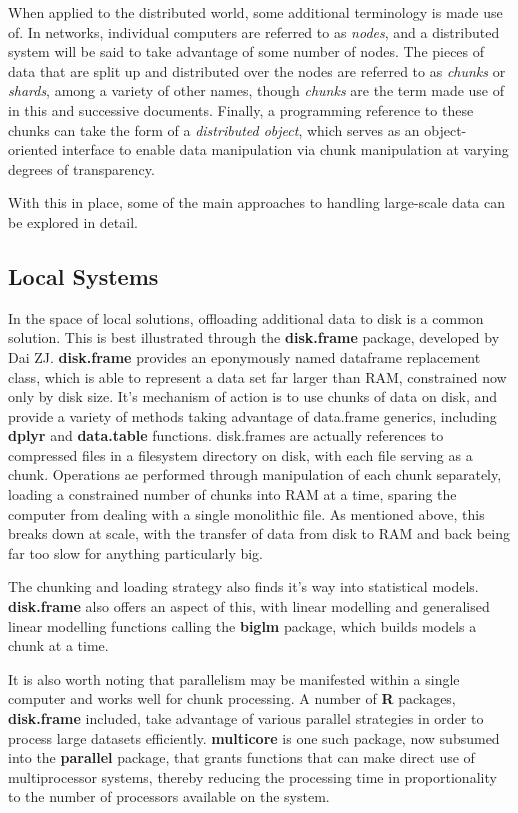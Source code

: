 When applied to the distributed world, some additional terminology is made use of.
In networks, individual computers are referred to as \textit{nodes}, and a distributed system will be said to take advantage of some number of nodes.
The pieces of data that are split up and distributed over the nodes are referred to as \textit{chunks} or \textit{shards}, among a variety of other names, though \textit{chunks} are the term made use of in this and successive documents.
Finally, a programming reference to these chunks can take the form of a \textit{distributed object}, which serves as an object-oriented interface to enable data manipulation via chunk manipulation at varying degrees of transparency.

With this in place, some of the main approaches to handling large-scale data can be explored in detail.

\subsection{Local Systems}

In the space of local solutions, offloading additional data to disk is a common solution.
This is best illustrated through the \textbf{disk.frame} package, developed by Dai ZJ.
\textbf{disk.frame} provides an eponymously named dataframe replacement class, which is able to represent a data  set far larger than RAM, constrained now only by disk size\cite{zj20}.
It's mechanism of action is to use chunks of data on disk, and provide a variety of methods taking advantage of data.frame generics, including \textbf{dplyr} and \textbf{data.table} functions.
disk.frames are actually references to compressed files in a filesystem directory on disk, with each file serving as a chunk.
Operations ae performed through manipulation of each chunk separately, loading a constrained number of chunks into RAM at a time, sparing the computer from dealing with a single monolithic file\cite{zj19:_inges_data}.
As mentioned above, this breaks down at scale, with the transfer of data from disk to RAM and back being far too slow for anything particularly big.

The chunking and loading strategy also finds it's way into statistical models.
\textbf{disk.frame} also offers an aspect of this, with linear modelling and generalised linear modelling functions calling the \textbf{biglm} package, which builds models a chunk at a time.

It is also worth noting that parallelism may be manifested within a single computer and works well for chunk processing.
A number of \textbf{R} packages, \textbf{disk.frame} included, take advantage of various parallel strategies in order to process large datasets efficiently.
\textbf{multicore} is one such package, now subsumed into the \textbf{parallel} package, that grants functions that can make direct use of multiprocessor systems, thereby reducing the processing time in proportionality to the number of processors available on the system.

